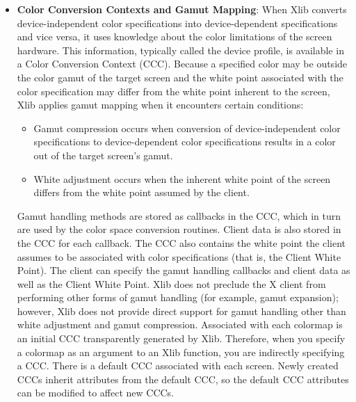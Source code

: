 \documentclass{report}
\begin{document}
\begin{itemize}
            \bigbreak \noindent 
            All of the values (C, H, V, X, Y, Z, a, b, u, v, y, x) are floating-point values. The syntax for these values is an optional plus or minus sign, a string of digits possibly containing a decimal point, and an optional exponent field consisting of an ‘‘E’’ or ‘‘e’’ followed by an optional plus or minus followed by a string of digits.
        \item \textbf{Color Conversion Contexts and Gamut Mapping}: When Xlib converts device-independent color specifications into device-dependent specifications and vice versa, it uses knowledge about the color limitations of the screen hardware. This information, typically called the device profile, is available in a Color Conversion Context (CCC).
            \bigbreak \noindent 
            Because a specified color may be outside the color gamut of the target screen and the white point associated with the color specification may differ from the white point inherent to the screen, Xlib applies gamut mapping when it encounters certain conditions:
            \begin{itemize}
                \item Gamut compression occurs when conversion of device-independent color specifications to device-dependent color specifications results in a color out of the target screen’s gamut.
                \item White adjustment occurs when the inherent white point of the screen differs from the white point assumed by the client.
            \end{itemize}
            Gamut handling methods are stored as callbacks in the CCC, which in turn are used by the color space conversion routines. Client data is also stored in the CCC for each callback. The CCC also contains the white point the client assumes to be associated with color specifications (that is, the Client White Point). The client can specify the gamut handling callbacks and client data as well as the Client White Point. Xlib does not preclude the X client from performing other forms of gamut handling (for example, gamut expansion); however, Xlib does not provide direct support for gamut handling other than white adjustment and gamut compression.
            \bigbreak \noindent 
            Associated with each colormap is an initial CCC transparently generated by Xlib. Therefore, when you specify a colormap as an argument to an Xlib function, you are indirectly specifying a CCC. There is a default CCC associated with each screen. Newly created CCCs inherit attributes from the default CCC, so the default CCC attributes can be modified to affect new CCCs.

\end{itemize}
\end{document}
